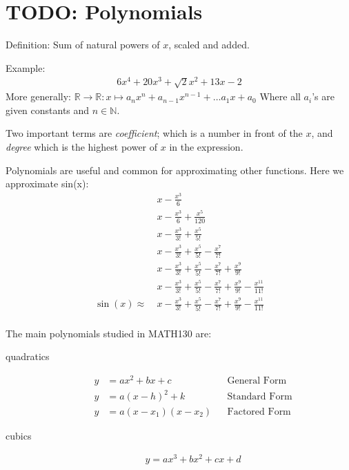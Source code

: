 \chapter{TODO: Polynomials}
\label{chap:Polynomials}
Definition: Sum of natural powers of $x$, scaled and added.

Example:
\begin{align}
  6x^4 + 20x^3 + \sqrt{2}x^2 + 13x - 2
\end{align}
More generally:
$\mathbb{R} \to \mathbb{R} : x \mapsto a_nx^n + a_{n-1}x^{n-1} + \ldots a_1x + a_0$ 
Where all $a_i$'s are given constants and $n \in \mathbb{N}$.

\noindent Two important terms are \emph{coefficient}; which is a number in front
of the $x$, and \emph{degree} which is the highest power of $x$ in the expression.

\noindent Polynomials are useful and common for approximating other functions.
Here we approximate sin(x):
\begin{align}
  &~ x - \frac{x^{3}}{6} \\
  &~ x - \frac{x^{3}}{6} + \frac{x^5}{120} \\
  &~ x - \frac{x^{3}}{3!} + \frac{x^5}{5!} \\
  &~ x - \frac{x^{3}}{3!} + \frac{x^5}{5!} - \frac{x^7}{7!} \\
  &~ x - \frac{x^{3}}{3!} + \frac{x^5}{5!} - \frac{x^7}{7!} + \frac{x^9}{9!} \\
  &~ x - \frac{x^{3}}{3!} + \frac{x^5}{5!} - \frac{x^7}{7!} + \frac{x^9}{9!} -
  \frac{x^11}{11!} \\
 \sin(x) \approx &~ x - \frac{x^{3}}{3!} + \frac{x^5}{5!} - \frac{x^7}{7!} +
 \frac{x^9}{9!} - \frac{x^11}{11!} \\
\end{align}

The main polynomials studied in MATH130 are:
\begin{description}
  \item[quadratics]
    \begin{align}
      y & = ax^2 + bx + c       && \text{General Form} \\
      y & = a(x - h)^{2} + k    && \text{Standard Form} \\
      y & = a(x - x_1)(x - x_2) && \text{Factored Form}
    \end{align}
  \item[cubics]
    \begin{align}
      y = ax^3 + bx^2 + cx + d
    \end{align}
\end{description}

